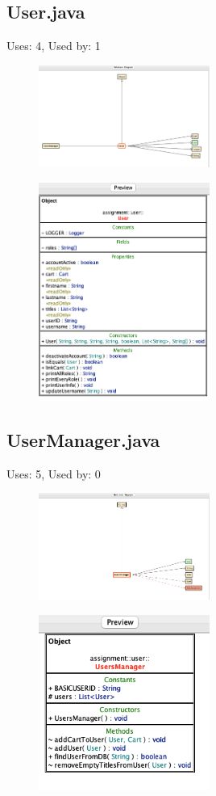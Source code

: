 \documentclass{article}
\begin{document}
\subsection{User.java}
Uses: 4, Used by: 1
\begin{figure}[H]
    \centering
    \includegraphics[width=0.5\textwidth]{img/userDiagram.png}
\end{figure}
\begin{figure}[H]
    \centering
    \includegraphics[width=0.5\textwidth]{img/userPreview.png}
\end{figure}
\subsection{UserManager.java}
Uses: 5, Used by: 0
\begin{figure}[H]
    \centering
    \includegraphics[width=0.5\textwidth]{img/userManagerDiagram.png}
\end{figure}
\begin{figure}[H]
    \centering
    \includegraphics[width=0.5\textwidth]{img/userManagerPreview.png}
\end{figure}
\end{document}
